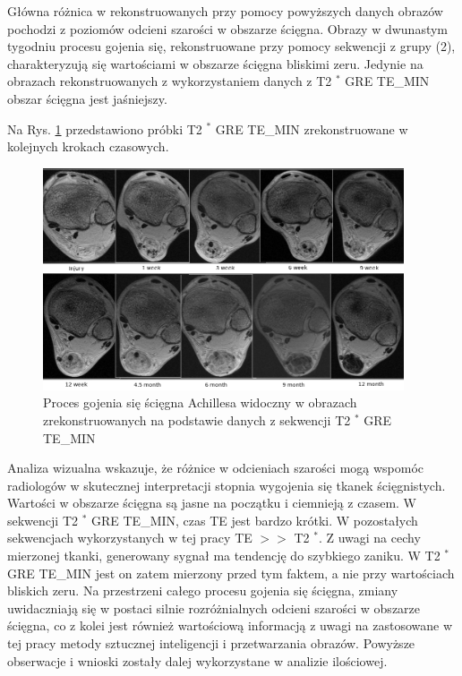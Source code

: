 Główna różnica w rekonstruowanych przy pomocy powyższych danych obrazów pochodzi z poziomów odcieni szarości w obszarze ścięgna. Obrazy w dwunastym tygodniu procesu gojenia się, rekonstruowane przy pomocy sekwencji z grupy (2), charakteryzują się wartościami w obszarze ścięgna bliskimi zeru. Jedynie na obrazach rekonstruowanych z wykorzystaniem danych z T2 $^\ast$ GRE TE\_MIN obszar ścięgna jest jaśniejszy. 

Na Rys. \ref{fig:T2comp} przedstawiono próbki T2 $^\ast$ GRE TE\_MIN zrekonstruowane w kolejnych krokach czasowych.

\begin{figure}[h]
	\centering
	\includegraphics[width=0.95\textwidth]{figures/T2gremin.png}
	\caption{Proces gojenia się ścięgna Achillesa widoczny w obrazach zrekonstruowanych na podstawie danych z sekwencji T2 $^\ast$ GRE TE\_MIN}\label{fig:T2comp}
\end{figure}

Analiza wizualna wskazuje, że różnice w odcieniach szarości mogą wspomóc radiologów w skutecznej interpretacji stopnia wygojenia się tkanek ścięgnistych. Wartości w obszarze ścięgna są jasne na początku i ciemnieją z czasem. 
W sekwencji T2 $^\ast$ GRE TE\_MIN, czas TE jest bardzo krótki. W pozostałych sekwencjach wykorzystanych w tej pracy TE $>>$ T2 $^\ast$. Z uwagi na cechy mierzonej tkanki, generowany sygnał ma tendencję do szybkiego zaniku. W T2 $^\ast$ GRE TE\_MIN jest on zatem mierzony przed tym faktem, a nie przy wartościach bliskich zeru. Na przestrzeni całego procesu gojenia się ścięgna, zmiany uwidaczniają się w postaci silnie rozróżnialnych odcieni szarości w obszarze ścięgna, co z kolei jest również wartościową informacją z uwagi na zastosowane w tej pracy metody sztucznej inteligencji i przetwarzania obrazów. Powyższe obserwacje i wnioski zostały dalej wykorzystane w analizie ilościowej.

